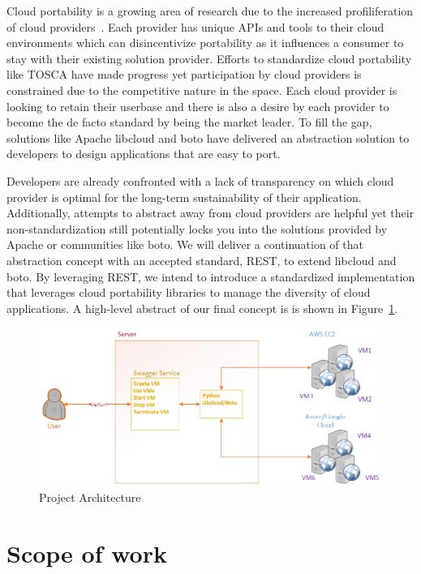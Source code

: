 Cloud portability is a growing area of research due to the increased
profiliferation of cloud providers~\cite{hid-sp18-518-Cloud-Council}. 
Each provider has unique APIs and tools to their cloud environments 
which can disincentivize portability as it influences a consumer to 
stay with their existing solution provider. Efforts to standardize 
cloud portability like TOSCA have made progress yet participation by 
cloud providers is constrained due to the competitive nature in the 
space. Each cloud provider is looking to retain their userbase and 
there is also a desire by each provider to become the de facto 
standard by being the market leader. To fill the gap, solutions like 
Apache libcloud and boto have delivered an abstraction solution to 
developers to design applications that are easy to port.

Developers are already confronted with a lack of transparency on which
cloud provider is optimal for the long-term sustainability of their
application. Additionally, attempts to abstract away from cloud
providers are helpful yet their non-standardization still potentially
locks you into the solutions provided by Apache or communities like
boto. We will deliver a continuation of that abstraction concept with an
accepted standard, REST, to extend libcloud and boto. By leveraging
REST, we intend to introduce a standardized implementation that
leverages cloud portability libraries to manage the diversity of cloud
applications. A high-level abstract of our final concept is is shown
in Figure~\ref{F:arch}.

\begin{figure}[!ht]
  \centering
  \includegraphics[width=\columnwidth]{images/proj-arch.png}
  \caption{Project Architecture}\label{F:arch}
\end{figure}


\section{Scope of work}\label{scope-of-work}


